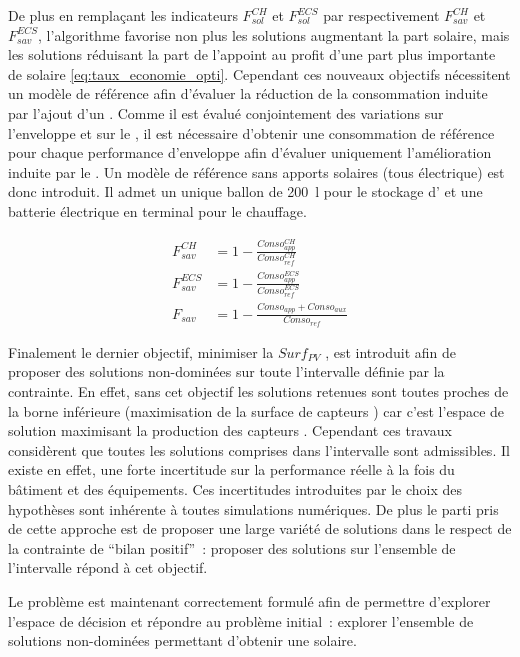 De plus en remplaçant les indicateurs $F_{sol}^{CH}$ et $F_{sol}^{ECS}$ par respectivement
$F_{sav}^{CH}$ et $F_{sav}^{ECS}$, l’algorithme favorise non plus les solutions
augmentant la part solaire, mais les solutions réduisant la part de l’appoint au
profit d’une part plus importante de solaire \eqref{eq:taux_economie_opti}. Cependant ces nouveaux objectifs
nécessitent un modèle de référence afin d’évaluer la réduction de la consommation
induite par l’ajout d’un . Comme il est évalué conjointement des variations
sur l’enveloppe et sur le , il est nécessaire d’obtenir une consommation
de référence pour chaque performance d’enveloppe afin d’évaluer uniquement
l’amélioration induite par le . Un modèle de référence sans apports solaires
(tous électrique) est donc introduit. Il admet un unique ballon de \SI{200}{\litre} pour le stockage
d’ et une batterie électrique en terminal pour le chauffage.

\begin{align}\label{eq:taux_economie_opti}
  F_{sav}^{CH}   &= 1 - \frac{Conso_{app}^{CH}}{Conso_{ref}^{CH}} \\
  F_{sav}^{ECS}  &= 1 - \frac{Conso_{app}^{ECS}}{Conso_{ref}^{ECS}} \\
  F_{sav}        &= 1 - \frac{Conso_{app} + Conso_{aux}}{Conso_{ref}}
\end{align}

Finalement le dernier objectif, minimiser la $Surf_{PV}$ , est introduit afin de proposer des solutions non-dominées
sur toute l’intervalle définie par la contrainte. En effet, sans cet objectif les solutions
retenues sont toutes proches de la borne inférieure (maximisation de la surface de capteurs )
car c’est l’espace de solution maximisant la production des capteurs . Cependant ces travaux considèrent que
toutes les solutions comprises dans l’intervalle sont admissibles. Il existe en effet,
une forte incertitude sur la performance réelle à la fois du bâtiment et des équipements. Ces
incertitudes introduites par le choix des hypothèses sont inhérente à toutes simulations numériques.
De plus le parti pris de cette approche est de proposer une large variété de solutions dans le
respect de la contrainte de \enquote{bilan positif}~: proposer des solutions
sur l’ensemble de l’intervalle répond à cet objectif.

Le problème est maintenant correctement formulé afin de permettre d’explorer l’espace de décision et
répondre au problème initial~: explorer l’ensemble de solutions non-dominées permettant
d’obtenir une  solaire.



